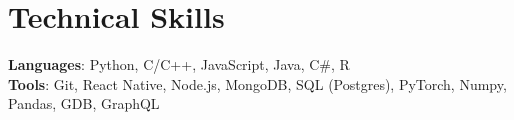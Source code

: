 \documentclass[letterpaper,11pt]{article}
\begin{document}
%
\section{Technical Skills}
 \begin{itemize}[leftmargin=0.15in, label={}]
    \small{\item{
     \textbf{Languages}{: Python, C/C++, JavaScript, Java, C\#, R} \\
     \textbf{Tools}{: Git, React Native, Node.js, MongoDB, SQL (Postgres), PyTorch, Numpy, Pandas, GDB, GraphQL} \\
    }}
 \end{itemize}


\end{document}
